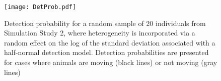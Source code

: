 \documentclass[aoas,preprint]{imsart}
\numberwithin{equation}{section}
\theoremstyle{plain}
\begin{document}
\pagebreak
\begin{figure}
\begin{center}
\texttt{[image: DetProb.pdf]}
\caption{Detection probability for a random sample of 20 individuals from Simulation Study 2, where heterogeneity is incorporated via a random effect on the log of the standard deviation associated with a half-normal detection model.  Detection probabilities are presented for cases where animals are moving (black lines) or not moving (gray lines)}
\label{fig:hn}
\end{center}
\end{figure}
\end{document}

